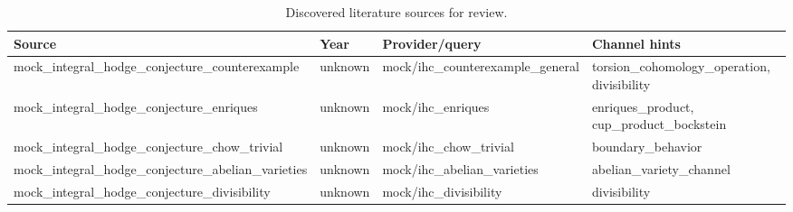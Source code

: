 \begin{table}[h]
\centering
\caption{Discovered literature sources for review.}
\label{tab:literature-discovery-sources}
\footnotesize
\renewcommand{\arraystretch}{1.18}
\begin{tabular}{|p{}|p{}|p{}|p{}|}
\hline
\centering\textbf{Source} & \centering\textbf{Year} & \centering\textbf{Provider/query} & \centering\arraybackslash\textbf{Channel hints} \\
\hline
mock\_\allowbreak{}integral\_\allowbreak{}hodge\_\allowbreak{}conjecture\_\allowbreak{}counterexample & unknown & mock/ihc\_\allowbreak{}counterexample\_\allowbreak{}general & torsion\_\allowbreak{}cohomology\_\allowbreak{}operation, divisibility \\
mock\_\allowbreak{}integral\_\allowbreak{}hodge\_\allowbreak{}conjecture\_\allowbreak{}enriques & unknown & mock/ihc\_\allowbreak{}enriques & enriques\_\allowbreak{}product, cup\_\allowbreak{}product\_\allowbreak{}bockstein \\
mock\_\allowbreak{}integral\_\allowbreak{}hodge\_\allowbreak{}conjecture\_\allowbreak{}chow\_\allowbreak{}trivial & unknown & mock/ihc\_\allowbreak{}chow\_\allowbreak{}trivial & boundary\_\allowbreak{}behavior \\
mock\_\allowbreak{}integral\_\allowbreak{}hodge\_\allowbreak{}conjecture\_\allowbreak{}abelian\_\allowbreak{}varieties & unknown & mock/ihc\_\allowbreak{}abelian\_\allowbreak{}varieties & abelian\_\allowbreak{}variety\_\allowbreak{}channel \\
mock\_\allowbreak{}integral\_\allowbreak{}hodge\_\allowbreak{}conjecture\_\allowbreak{}divisibility & unknown & mock/ihc\_\allowbreak{}divisibility & divisibility \\
\hline
\end{tabular}
\end{table}
